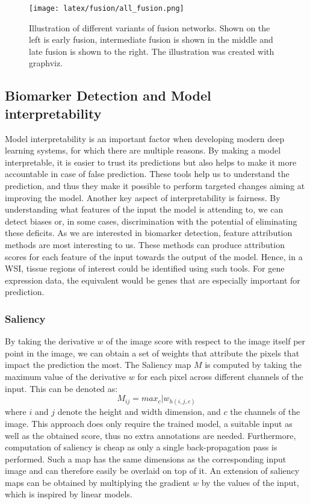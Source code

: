 \begin{figure}[h!t]
    \centering
    \texttt{[image: latex/fusion/all\_fusion.png]}
    \caption[Multimodal Fusion categories]{Illustration of different variants of fusion networks. Shown on the left is early fusion, intermediate fusion is shown in the middle and late fusion is shown to the right. The illustration was created with graphviz. \cite{Gansner2000Open}}
    \label{fig:fusion_graphs}
\end{figure}


\subsection{Biomarker Detection and Model interpretability}

Model interpretability is an important factor when developing modern deep learning systems, for which there are multiple reasons. By making a model interpretable, it is easier to trust its predictions but also helps to make it more accountable in case of false prediction. These tools help us to understand the prediction, and thus they make it possible to perform targeted changes aiming at improving the model. Another key aspect of interpretability is fairness. By understanding what features of the input the model is attending to, we can detect biases or, in some cases, discrimination with the potential of eliminating these deficits.
As we are interested in biomarker detection, feature attribution methods are most interesting to us. These methods can produce attribution scores for each feature of the input towards the output of the model. Hence, in a WSI, tissue regions of interest could be identified using such tools. For gene expression data, the equivalent would be genes that are especially important for prediction.

\subsubsection{Saliency}

By taking the derivative \(w\) of the image score with respect to the image itself per point in the image, we can obtain a set of weights that attribute the pixels that impact the prediction the most. The Saliency map \(M\) is computed by taking the maximum value of the derivative \(w\)  for each pixel across different channels of the input. This can be denoted as:
\[ M_{ij} = max_c | w_{h(i,j,c)}\]
where \(i\) and \(j\) denote the height and width dimension, and \(c\) the channels of the image. This approach does only require the trained model, a suitable input as well as the obtained score, thus no extra annotations are needed. Furthermore, computation of saliency is cheap as only a single back-propagation pass is performed. \cite{Simonyan2013Deep}
Such a map has the same dimensions as the corresponding input image and can therefore easily be overlaid on top of it.
An extension of saliency maps can be obtained by multiplying the gradient \(w\) by the values of the input, which is inspired by linear models. \cite{Shrikumar2016Not}

